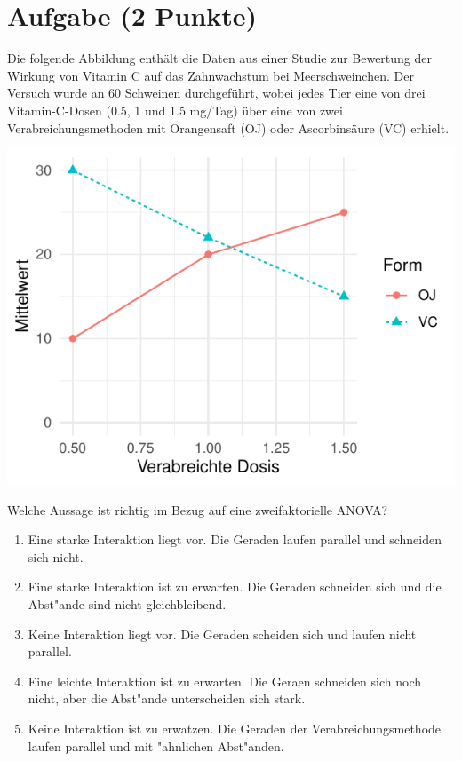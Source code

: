 \documentclass[a4paper, 9pt]{scrartcl}\usepackage[]{graphicx}\usepackage[]{xcolor}
\makeatletter
\def\maxwidth{ %
  \ifdim\Gin@nat@width>\linewidth
    \linewidth
  \else
    \Gin@nat@width
  \fi
}
\makeatother
\begin{document}
\section{Aufgabe \hfill (2 Punkte)}

Die folgende Abbildung enth{\"a}lt die Daten aus einer Studie zur
Bewertung der Wirkung von Vitamin C auf das Zahnwachstum bei
Meerschweinchen. Der Versuch wurde an 60 Schweinen durchgef{\"u}hrt, wobei
jedes Tier eine von drei Vitamin-C-Dosen (0.5, 1 und 1.5 mg/Tag) {\"u}ber eine
von zwei Verabreichungsmethoden mit Orangensaft (OJ)  oder
Ascorbins{\"a}ure (VC) erhielt. 



{\centering \includegraphics[width=\maxwidth]{img/mc-anova-02-a-1} 

}




Welche Aussage ist richtig im Bezug auf eine zweifaktorielle ANOVA?



\begin{enumerate}
\item [\textbf{A} \msquare] Eine starke Interaktion liegt vor. Die Geraden laufen parallel und schneiden sich nicht.
\item [\textbf{B} \msquare] Eine starke Interaktion ist zu erwarten. Die Geraden schneiden sich und die Abst{"a}nde sind nicht gleichbleibend.
\item [\textbf{C} \msquare] Keine Interaktion liegt vor. Die Geraden scheiden sich und laufen nicht parallel.
\item [\textbf{D} \msquare] Eine leichte Interaktion ist zu erwarten. Die Geraen schneiden sich noch nicht, aber die Abst{"a}nde unterscheiden sich stark.
\item [\textbf{E} \msquare] Keine Interaktion ist zu erwatzen. Die Geraden der Verabreichungsmethode laufen parallel und mit {"a}hnlichen Abst{"a}nden.
\end{enumerate} 
\end{document}
